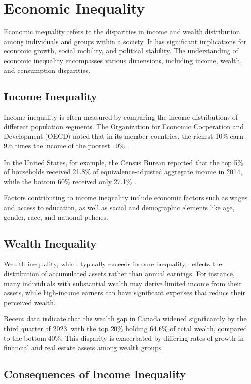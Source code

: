 \documentclass[12pt]{article}
\begin{document}
\section*{Economic Inequality}

Economic inequality refers to the disparities in income and wealth distribution among individuals and groups within a society. It has significant implications for economic growth, social mobility, and political stability. The understanding of economic inequality encompasses various dimensions, including income, wealth, and consumption disparities.

\subsection*{Income Inequality}

Income inequality is often measured by comparing the income distributions of different population segments. The Organization for Economic Cooperation and Development (OECD) noted that in its member countries, the richest 10\% earn 9.6 times the income of the poorest 10\% .

In the United States, for example, the Census Bureau reported that the top 5\% of households received 21.8\% of equivalence-adjusted aggregate income in 2014, while the bottom 60\% received only 27.1\% .

Factors contributing to income inequality include economic factors such as wages and access to education, as well as social and demographic elements like age, gender, race, and national policies.

\subsection*{Wealth Inequality}

Wealth inequality, which typically exceeds income inequality, reflects the distribution of accumulated assets rather than annual earnings. For instance, many individuals with substantial wealth may derive limited income from their assets, while high-income earners can have significant expenses that reduce their perceived wealth.

Recent data indicate that the wealth gap in Canada widened significantly by the third quarter of 2023, with the top 20\% holding 64.6\% of total wealth, compared to the bottom 40\%.  This disparity is exacerbated by differing rates of growth in financial and real estate assets among wealth groups.

\subsection*{Consequences of Income Inequality}
\end{document}
